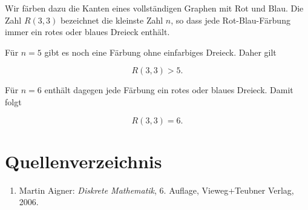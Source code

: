\documentclass{article}
\begin{document}
Wir färben dazu die Kanten eines vollständigen Graphen mit Rot und Blau.
Die Zahl \(R(3,3)\) bezeichnet die kleinste Zahl \(n\), so dass jede
Rot-Blau-Färbung immer ein rotes oder blaues Dreieck enthält.

Für \(n=5\) gibt es noch eine Färbung ohne einfarbiges Dreieck. Daher gilt

\[
R(3,3)>5.
\]

Für \(n=6\) enthält dagegen jede Färbung ein rotes oder blaues Dreieck.
Damit folgt

\[
R(3,3)=6.
\]

\section*{Quellenverzeichnis}

\begin{enumerate}
    \item Martin Aigner:
    \textit{Diskrete Mathematik},
    6. Auflage,
    Vieweg+Teubner Verlag,
    2006.
\end{enumerate}
\end{document}
